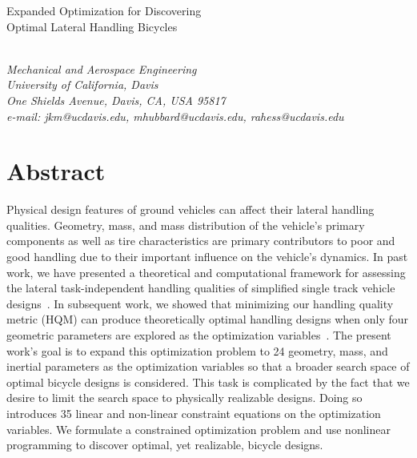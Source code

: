\documentclass{bmd2019a}
\begin{document}
\begin{flushleft}
{\fontsize{16pt}{20pt}\selectfont%
  Expanded Optimization for Discovering\\}
{\fontsize{16pt}{20pt}\selectfont%
  Optimal Lateral Handling Bicycles}
\end{flushleft}

\begin{flushleft}
  {\\}
  \textit{Mechanical and Aerospace Engineering\\
          University of California, Davis\\
          One Shields Avenue, Davis, CA, USA 95817\\
          e-mail: jkm@ucdavis.edu, mhubbard@ucdavis.edu, rahess@ucdavis.edu}
\end{flushleft}


\section*{Abstract}
%
Physical design features of ground vehicles can affect their lateral handling
qualities. Geometry, mass, and mass distribution of the vehicle's primary
components as well as tire characteristics are primary contributors to poor and
good handling due to their important influence on the vehicle's dynamics. In
past work, we have presented a theoretical and computational framework for
assessing the lateral task-independent handling qualities of simplified single
track vehicle designs~\cite{Hess2012,Moore2012}. In subsequent work, we showed
that minimizing our handling quality metric (HQM) can produce theoretically
optimal handling designs when only four geometric parameters are explored as
the optimization variables~\cite{Moore2016}. The present work's goal is to
expand this optimization problem to 24 geometry, mass, and inertial parameters
as the optimization variables so that a broader search space of optimal bicycle
designs is considered. This task is complicated by the fact that we desire to
limit the search space to physically realizable designs. Doing so introduces 35
linear and non-linear constraint equations on the optimization variables. We
formulate a constrained optimization problem and use nonlinear programming to
discover optimal, yet realizable, bicycle designs.
\end{document}
